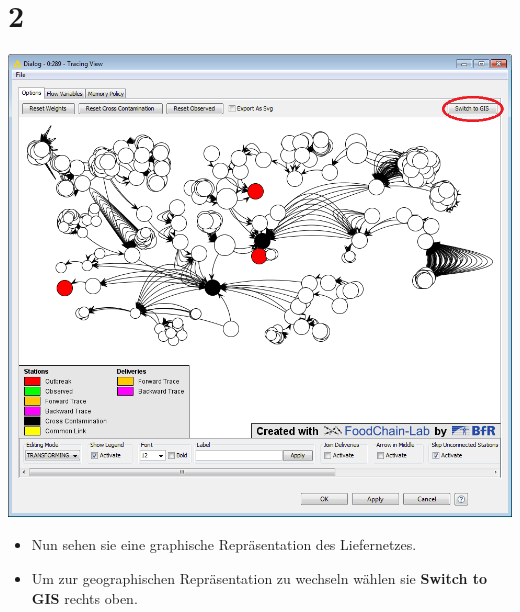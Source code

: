 \documentclass{beamer}
\begin{document}
\section{2}
\begin{frame}
	\begin{center}
  		\includegraphics[height=0.6\textheight]{2.png}
	\end{center}
	\begin{itemize}
		\item Nun sehen sie eine graphische Repräsentation des Liefernetzes.
		\item Um zur geographischen Repräsentation zu wechseln wählen sie \textbf{Switch to GIS} rechts oben.
	\end{itemize}
\end{frame}
\end{document}
